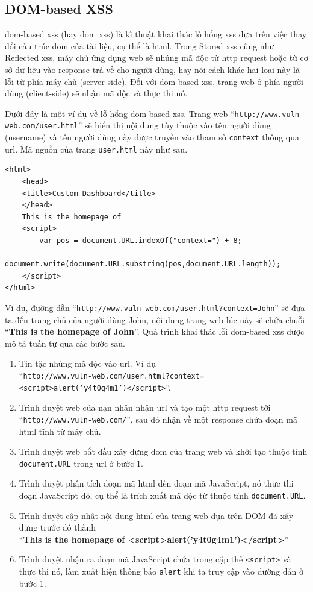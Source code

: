 \subsection{DOM-based XSS}
\acrshort{dom}-based \acrshort{xss} (hay \acrshort{dom} \acrshort{xss}) là kĩ thuật khai thác lỗ hổng \acrshort{xss} dựa trên việc thay đổi cấu trúc \acrshort{dom} của tài liệu, cụ thể là \acrshort{html}. Trong Stored \acrshort{xss} cũng như Reflected \acrshort{xss}, máy chủ ứng dụng web sẽ nhúng mã độc từ \acrshort{http} request hoặc từ cơ sở dữ liệu vào response trả về cho người dùng, hay nói cách khác hai loại này là lỗi từ phía máy chủ (server-side). Đối với \acrshort{dom}-based \acrshort{xss}, trang web ở phía người dùng (client-side) sẽ nhận mã độc và thực thi nó.\par
Dưới đây là một ví dụ về lỗ hổng \acrshort{dom}-based \acrshort{xss}. Trang web ``\texttt{http://www.vuln-web.com/user.html}'' sẽ hiển thị nội dung tùy thuộc vào tên người dùng (username) và tên người dùng này được truyền vào tham số \texttt{context} thông qua \acrshort{url}. Mã nguồn của trang \texttt{user.html} này như sau.
\begin{lstlisting}[style=htmlcssjs]
<html>
    <head>
    <title>Custom Dashboard</title>
    </head>
    This is the homepage of 
    <script>
    	var pos = document.URL.indexOf("context=") + 8;
    	document.write(document.URL.substring(pos,document.URL.length));
    </script>
</html>
\end{lstlisting}
Ví dụ, đường dẫn ``\texttt{http://www.vuln-web.com/user.html?context=John}'' sẽ đưa ta đến trang chủ của người dùng John, nội dung trang web lúc này sẽ chứa chuỗi ``\textbf{This is the homepage of John}''. Quá trình khai thác lỗi \acrshort{dom}-based \acrshort{xss} được mô tả tuần tự qua các bước sau.
\begin{enumerate}
    \item Tin tặc nhúng mã độc vào \acrshort{url}. Ví dụ\\ ``\texttt{http://www.vuln-web.com/user.html?context=<script>alert('y4t0g4m1')</script>}''.
    \item Trình duyệt web của nạn nhân nhận \acrshort{url} và tạo một \acrshort{http} request tới ``\texttt{http://www.vuln-web.com/}'', sau đó nhận về một response chứa đoạn mã \acrshort{html} tĩnh từ máy chủ.
    \item Trình duyệt web bắt đầu xây dựng \acrshort{dom} của trang web và khởi tạo thuộc tính \texttt{document.URL} trong \acrshort{url} ở bước 1.
    \item Trình duyệt phân tích đoạn mã \acrshort{html} đến đoạn mã JavaScript, nó thực thi đoạn JavaScript đó, cụ thể là trích xuất mã độc từ thuộc tính \texttt{document.URL}.
    \item Trình duyệt cập nhật nội dung \acrshort{html} của trang web dựa trên DOM đã xây dựng trước đó thành\\``\textbf{This is the homepage of <script>alert('y4t0g4m1')</script>}''
    \item Trình duyệt nhận ra đoạn mã JavaScript chứa trong cặp thẻ \texttt{<script>} và thực thi nó, làm xuất hiện thông báo \texttt{alert} khi ta truy cập vào đường dẫn ở bước 1.
\end{enumerate}
